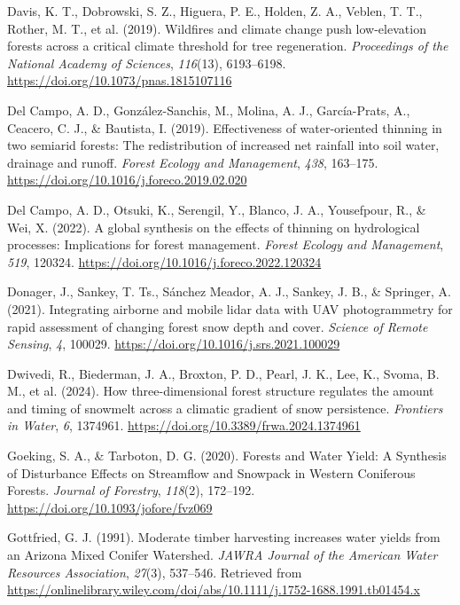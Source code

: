 \documentclass[
]{agujournal2019}
\newlength{\cslhangindent}
\newenvironment{CSLReferences}[2] %
 {\begin{list}{}{%
  \setlength{\itemindent}{0pt}
  \setlength{\leftmargin}{0pt}
  \setlength{\parsep}{0pt}
  \ifodd #1
   \setlength{\leftmargin}{\cslhangindent}
   \setlength{\itemindent}{-1\cslhangindent}
  \fi
  \setlength{\itemsep}{#2\baselineskip}}}
 {\end{list}}
\begin{document}
\begin{CSLReferences}{1}{0}
Davis, K. T., Dobrowski, S. Z., Higuera, P. E., Holden, Z. A., Veblen,
T. T., Rother, M. T., et al. (2019). Wildfires and climate change push
low-elevation forests across a critical climate threshold for tree
regeneration. \emph{Proceedings of the National Academy of Sciences},
\emph{116}(13), 6193--6198.
\url{https://doi.org/10.1073/pnas.1815107116}

Del Campo, A. D., González-Sanchis, M., Molina, A. J., García-Prats, A.,
Ceacero, C. J., \& Bautista, I. (2019). Effectiveness of water-oriented
thinning in two semiarid forests: {The} redistribution of increased net
rainfall into soil water, drainage and runoff. \emph{Forest Ecology and
Management}, \emph{438}, 163--175.
\url{https://doi.org/10.1016/j.foreco.2019.02.020}

Del Campo, A. D., Otsuki, K., Serengil, Y., Blanco, J. A., Yousefpour,
R., \& Wei, X. (2022). A global synthesis on the effects of thinning on
hydrological processes: {Implications} for forest management.
\emph{Forest Ecology and Management}, \emph{519}, 120324.
\url{https://doi.org/10.1016/j.foreco.2022.120324}

Donager, J., Sankey, T. Ts., Sánchez Meador, A. J., Sankey, J. B., \&
Springer, A. (2021). Integrating airborne and mobile lidar data with
{UAV} photogrammetry for rapid assessment of changing forest snow depth
and cover. \emph{Science of Remote Sensing}, \emph{4}, 100029.
\url{https://doi.org/10.1016/j.srs.2021.100029}

Dwivedi, R., Biederman, J. A., Broxton, P. D., Pearl, J. K., Lee, K.,
Svoma, B. M., et al. (2024). How three-dimensional forest structure
regulates the amount and timing of snowmelt across a climatic gradient
of snow persistence. \emph{Frontiers in Water}, \emph{6}, 1374961.
\url{https://doi.org/10.3389/frwa.2024.1374961}

Goeking, S. A., \& Tarboton, D. G. (2020). Forests and {Water} {Yield}:
{A} {Synthesis} of {Disturbance} {Effects} on {Streamflow} and
{Snowpack} in {Western} {Coniferous} {Forests}. \emph{Journal of
Forestry}, \emph{118}(2), 172--192.
\url{https://doi.org/10.1093/jofore/fvz069}

Gottfried, G. J. (1991). Moderate timber harvesting increases water
yields from an {Arizona} {Mixed} {Conifer} {Watershed}. \emph{JAWRA
Journal of the American Water Resources Association}, \emph{27}(3),
537--546. Retrieved from
\url{https://onlinelibrary.wiley.com/doi/abs/10.1111/j.1752-1688.1991.tb01454.x}


\end{CSLReferences}
\end{document}
